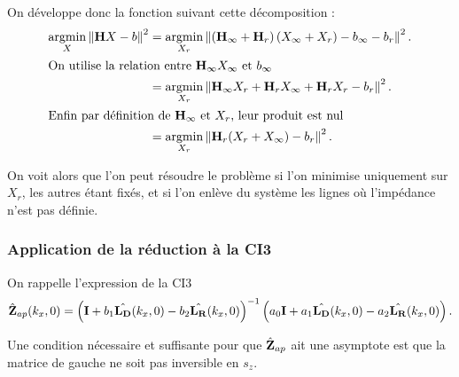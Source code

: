 On développe donc la fonction
suivant cette décomposition :
\begin{align*}
{\underset{X}{\operatorname{argmin}}}\left\rVert {\mathbf{H}} X - {b} \right \rVert^2 &= {\underset{X_r}{\operatorname{argmin}}}\left\rVert \left({\mathbf{H}}_\infty + {\mathbf{H}}_r\right)\left( X_\infty + X_r \right) - {b}_\infty - {b}_r \right \rVert^2.
\\
\intertext{On utilise la relation entre \({\mathbf{H}}_\infty X_\infty\) et \({b}_\infty\)}
&=  {\underset{X_r}{\operatorname{argmin}}}\left\rVert {\mathbf{H}}_\infty X_r + {\mathbf{H}}_r X_\infty + {\mathbf{H}}_r X_r - {b}_r \right \rVert^2.
\\
\intertext{Enfin par définition de \({\mathbf{H}}_\infty\) et \(X_r\), leur produit est nul}
&= {\underset{X_r}{\operatorname{argmin}}} \left\rVert {\mathbf{H}}_r ( X_r + X_\infty)- {b}_r \right \rVert^2.
\end{align*}

On voit alors que l'on peut résoudre le problème
si l'on minimise uniquement sur \(X_r\), les autres étant fixés, et si l'on enlève du système les lignes où l'impédance n'est pas définie.

\subsubsection{Application de la réduction à la CI3}

On rappelle l'expression de la CI3
\begin{equation*}
  \hat{\mathbf{Z}}_{ap}(k_x,0) = \left(\mathbf{I} + b_1 \hat{\mathbf{L_D}}(k_x,0) - b_2 \hat{\mathbf{L_R}}(k_x,0) \right)^{-1}\left(a_0\mathbf{I} + a_1 \hat{\mathbf{L_D}}(k_x,0) - a_2 \hat{\mathbf{L_R}}(k_x,0) \right).
\end{equation*}

Une condition nécessaire et suffisante pour que \(\hat{\mathbf{Z}}_{ap}\) ait une asymptote est que la matrice de gauche ne soit pas inversible en \(s_z\).


